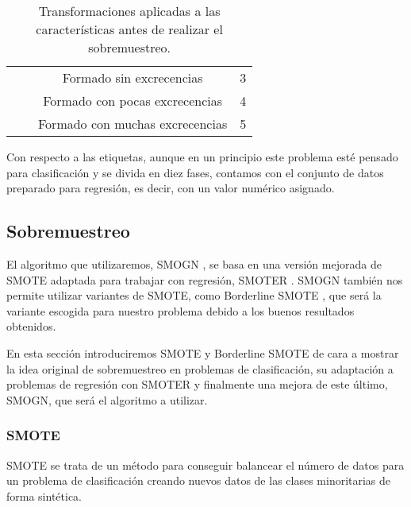 \begin{table}[H]
{\begin{tabular}{|c|c|c|c|}
                                                      &                            & Formado sin excrecencias        & 3                                \\ \cline{3-4}
                                                      &                            & Formado con pocas excrecencias  & 4                                \\ \cline{3-4}
                                                      &                            & Formado con muchas excrecencias & 5                                \\ \hline
\end{tabular}%
}
\caption{Transformaciones aplicadas a las características antes de realizar el sobremuestreo.}\label{table:transformaciones_numericas}

\end{table}

Con respecto a las etiquetas, aunque en un principio este problema esté pensado para clasificación y se divida en diez fases, contamos con el conjunto de datos preparado para regresión, es decir, con un valor numérico asignado.


\subsection{Sobremuestreo} \label{sobremuestreo}

El algoritmo que utilizaremos, SMOGN \cite{SMOGN}, se basa en una versión mejorada de SMOTE \cite{SMOTE} adaptada para trabajar con regresión, SMOTER \cite{SMOTER}. SMOGN también nos permite utilizar variantes de SMOTE, como Borderline SMOTE \cite{BL-SMOTE}, que será la variante escogida para nuestro problema debido a los buenos resultados obtenidos.

En esta sección introduciremos SMOTE y Borderline SMOTE de cara a mostrar la idea original de sobremuestreo en problemas de clasificación, su adaptación a problemas de regresión con SMOTER y finalmente una mejora de este último, SMOGN, que será el algoritmo a utilizar.

\subsubsection{SMOTE}

SMOTE se trata de un método para conseguir balancear el número de datos para un problema de clasificación creando nuevos datos de las clases minoritarias de forma sintética.

